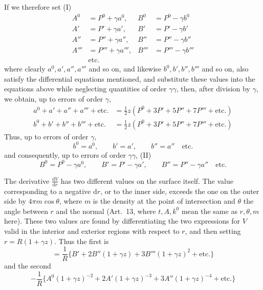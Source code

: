 If we therefore set (I)
\[
\begin{aligned}
A^0&=P^0+\gamma a^0,& B^0&=P^0-\gamma b^0\\
A'&=P'+\gamma a',& B'&=P'-\gamma b'\\
A''&=P''+\gamma a'',& B''&=P''-\gamma b''\\
A'''&=P'''+\gamma a''',& B'''&=P'''-\gamma b'''\\
&\text{etc.}
\end{aligned}
\]
where clearly $a^0,a',a'',a'''$ and so on, and likewise $b^0,b',b'',b'''$ and so on, also satisfy the differential equations mentioned, and substitute these values into the equations above while neglecting quantities of order $\gamma\gamma$, then, after division by $\gamma$, we obtain, up to errors of order $\gamma$,
\[
\begin{aligned}
a^0+a'+a''+a'''+\text{etc.}&=\tfrac12 z(P^0+3P'+5P''+7P'''+\text{etc.})\\
b^0+b'+b''+b'''+\text{etc.}&=\tfrac12 z(P^0+3P'+5P''+7P'''+\text{etc.})
\end{aligned}
\]
Thus, up to errors of order $\gamma$,
\[
b^0=a^0,\qquad b'=a',\qquad b''=a''\quad\text{etc.}
\]
and consequently, up to errors of order $\gamma\gamma$, (II)
\[
B^0=P^0-\gamma a^0,\qquad B'=P'-\gamma a',\qquad B''=P''-\gamma a''\quad\text{etc.}
\]

The derivative $\frac{\mathrm dV}{\mathrm dr}$ has two different values on the surface itself. The value corresponding to a negative $\mathrm dr$, or to the inner side, exceeds the one on the outer side by $4\pi m\cos\theta$, where $m$ is the density at the point of intersection and $\theta$ the angle between $r$ and the normal (Art.\ 13, where $t,A,k^0$ mean the same as $r,\theta,m$ here). These two values are found by differentiating the two expressions for $V$ valid in the interior and exterior regions with respect to $r$, and then setting $r=R(1+\gamma z)$. Thus the first is
\[
=\frac1R\{B'+2B''(1+\gamma z)+3B'''(1+\gamma z)^2+\text{etc.}\}
\]
and the second
\[
-\frac1R\{A^0(1+\gamma z)^{-2}+2A'(1+\gamma z)^{-3}+3A''(1+\gamma z)^{-4}+\text{etc.}\}
\]


